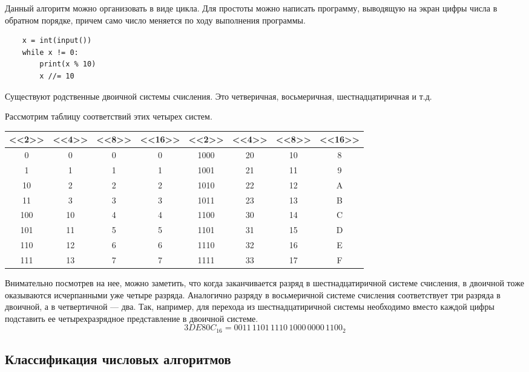 \documentclass[a4paper, fleqn]{article}
\begin{document}
	Данный алгоритм можно организовать в виде цикла. 
	Для простоты можно написать программу, выводящую на экран цифры числа в обратном порядке, причем само число меняется по ходу выполнения программы.
	\begin{lstlisting}
	x = int(input())
	while x != 0:
		print(x % 10)
		x //= 10
	\end{lstlisting}
		
	Существуют родственные двоичной системы счисления. Это четверичная, восьмеричная, шестнадцатиричная и т.д. 
	
	Рассмотрим таблицу соответствий этих четырех систем.
	
	\begin{tabular}{cccc|cccc}
		<<2>> & <<4>> & <<8>> & <<16>> & <<2>> & <<4>> & <<8>> & <<16>>\\
		\hline
		0 & 0 & 0 & 0 & 1000 & 20 & 10 & 8\\ 
		1&  1&  1&  1&  1001&  21&  11&  9\\ 
		10&  2&  2&  2&  1010&  22&  12&  A\\ 
		11&  3&  3&  3&  1011&  23&  13&  B\\ 
		100&  10&  4&  4&  1100&  30&  14&  C\\ 
		101&  11&  5&  5&  1101&  31&  15&  D\\ 
		110&  12&  6&  6&  1110&  32&  16&  E\\ 
		111&  13&  7&  7&  1111&  33&  17&  F\\ 
	\end{tabular}  
	
	Внимательно посмотрев на нее, можно заметить, что когда заканчивается разряд в шестнадцатиричной системе счисления, в двоичной тоже оказываются исчерпанными уже четыре разряда.
	Аналогично разряду в восьмеричной системе счисления соответствует три разряда в двоичной, а в четвертичной --- два.
	Так, например, для перехода из шестнадцатиричной системы необходимо вместо каждой цифры подставить ее четырехразрядное представление в двоичной системе. 
	\[3DE80C_16 = 0011\,1101\,1110\,1000\,0000\,1100_2\]
	
	\subsection*{Классификация числовых алгоритмов}
	 
\end{document}
